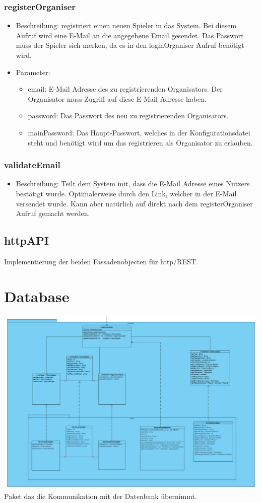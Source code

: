\documentclass[a4paper]{scrreprt}
\begin{document}
	\subsubsection{registerOrganiser}
    \begin{itemize}
        \item Beschreibung: registriert einen neuen Spieler in das System. Bei diesem Aufruf wird eine E-Mail an die angegebene Email gesendet. Das Passwort muss der Spieler sich merken, da es in den loginOrganiser Aufruf benötigt wird.
        \item Parameter:
        \begin{itemize}
            \item email: E-Mail Adresse des zu registrierenden Organisators. Der Organisator muss Zugriff auf diese E-Mail Adresse haben.
            \item password: Das Passwort des neu zu registrierenden Organisators.
            \item mainPassword: Das Haupt-Passwort, welches in der Konfigurationsdatei steht und benötigt wird um das registrieren als Organisator zu erlauben.
        \end{itemize}
    \end{itemize}
    \subsubsection{validateEmail}
    \begin{itemize}
        \item Beschreibung: Teilt dem System mit, dass die E-Mail Adresse eines Nutzers bestätigt wurde. Optimalerweise durch den Link, welcher in der E-Mail versendet wurde. Kann aber natürlich auf direkt nach dem registerOrganiser Aufruf gemacht werden.
    \end{itemize}
    \subsection{httpAPI}
    Implementierung der beiden Fassadenobjecten für http/REST.

	\section{Database}
	\includegraphics[width=\textwidth]{img/Database.PNG}
	Paket das die Kommunikation mit der Datenbank übernimmt.
\end{document}
